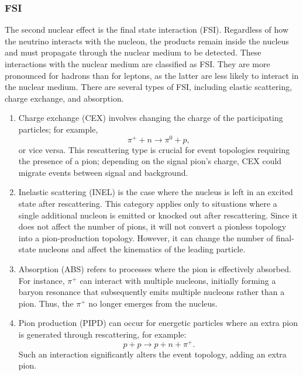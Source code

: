 \subsubsection{FSI}
\label{sec:nuint-fsi}
The second nuclear effect is the final state interaction (FSI).
Regardless of how the neutrino interacts with the nucleon, the products remain inside the nucleus and must propagate through the nuclear medium to be detected.
These interactions with the nuclear medium are classified as FSI.
They are more pronounced for hadrons than for leptons, as the latter are less likely to interact in the nuclear medium.
There are several types of FSI, including elastic scattering, charge exchange, and absorption.
\begin{enumerate}
  \item 
  Charge exchange (CEX) involves changing the charge of the participating particles; for example,
  \begin{equation}
      \pi^+ + n \rightarrow \pi^0 + p,
  \end{equation}
  or vice versa. This rescattering type is crucial for event topologies requiring the presence of a pion; depending on the signal pion’s charge, CEX could migrate events between signal and background. 

  \item 
  Inelastic scattering (INEL) is the case where the nucleus is left in an excited state after rescattering. This category applies only to situations where a single additional nucleon is emitted or knocked out after rescattering. Since it does not affect the number of pions, it will not convert a pionless topology into a pion-production topology. However, it can change the number of final-state nucleons and affect the kinematics of the leading particle.

  \item 
  Absorption (ABS) refers to processes where the pion is effectively absorbed. For instance, $\pi^+$ can interact with multiple nucleons, initially forming a baryon resonance that subsequently emits multiple nucleons rather than a pion. Thus, the $\pi^+$ no longer emerges from the nucleus.

  \item 
  Pion production (PIPD) can occur for energetic particles where an extra pion is generated through rescattering, for example:
  \begin{equation}
      p + p \rightarrow p + n + \pi^+.
  \end{equation}
  Such an interaction significantly alters the event topology, adding an extra pion.
\end{enumerate}

